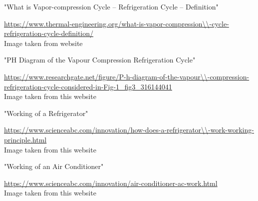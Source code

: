\documentclass[11pt]{article}
\begin{document}
\pagebreak
\begin{thebibliography}{}


"What is Vapor-compression Cycle – Refrigeration Cycle – Definition"

\url{https://www.thermal-engineering.org/what-is-vapor-compression\\-cycle-refrigeration-cycle-definition/}\\
Image taken from website
	
"PH Diagram of the Vapour Compression Refrigeration Cycle"

\url{https://www.researchgate.net/figure/P-h-diagram-of-the-vapour\\-compression-refrigeration-cycle-considered-in-Fig-1_fig3_316144041}\\
Image taken from this website


"Working of a Refrigerator"

\url{https://www.scienceabc.com/innovation/how-does-a-refrigerator\\-work-working-principle.html}\\
Image taken from this website
	
	
"Working of an Air Conditioner"

\url{https://www.scienceabc.com/innovation/air-conditioner-ac-work.html}\\
Image taken from this website
	

	
	
\end{thebibliography}
	
	
\end{document}

